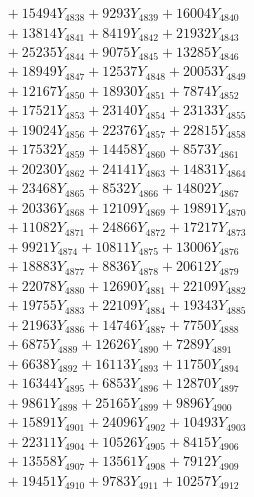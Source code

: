 \documentclass[a4paper,10pt]{article}
\begin{document}
{\begin{align}
&\;  + 15494 Y_{4838} + 9293 Y_{4839} + 16004 Y_{4840} \\[0.3ex]
&\;  + 13814 Y_{4841} + 8419 Y_{4842} + 21932 Y_{4843} \\[0.3ex]
&\;  + 25235 Y_{4844} + 9075 Y_{4845} + 13285 Y_{4846} \\[0.3ex]
&\;  + 18949 Y_{4847} + 12537 Y_{4848} + 20053 Y_{4849} \\[0.3ex]
&\;  + 12167 Y_{4850} + 18930 Y_{4851} + 7874 Y_{4852} \\[0.3ex]
&\;  + 17521 Y_{4853} + 23140 Y_{4854} + 23133 Y_{4855} \\[0.3ex]
&\;  + 19024 Y_{4856} + 22376 Y_{4857} + 22815 Y_{4858} \\[0.5ex]\allowbreak
&\;  + 17532 Y_{4859} + 14458 Y_{4860} + 8573 Y_{4861} \\[0.3ex]
&\;  + 20230 Y_{4862} + 24141 Y_{4863} + 14831 Y_{4864} \\[0.3ex]
&\;  + 23468 Y_{4865} + 8532 Y_{4866} + 14802 Y_{4867} \\[0.3ex]
&\;  + 20336 Y_{4868} + 12109 Y_{4869} + 19891 Y_{4870} \\[0.3ex]
&\;  + 11082 Y_{4871} + 24866 Y_{4872} + 17217 Y_{4873} \\[0.3ex]
&\;  + 9921 Y_{4874} + 10811 Y_{4875} + 13006 Y_{4876} \\[0.3ex]
&\;  + 18883 Y_{4877} + 8836 Y_{4878} + 20612 Y_{4879} \\[0.3ex]
&\;  + 22078 Y_{4880} + 12690 Y_{4881} + 22109 Y_{4882} \\[0.3ex]
&\;  + 19755 Y_{4883} + 22109 Y_{4884} + 19343 Y_{4885} \\[0.3ex]
&\;  + 21963 Y_{4886} + 14746 Y_{4887} + 7750 Y_{4888} \\[0.5ex]\allowbreak
&\;  + 6875 Y_{4889} + 12626 Y_{4890} + 7289 Y_{4891} \\[0.3ex]
&\;  + 6638 Y_{4892} + 16113 Y_{4893} + 11750 Y_{4894} \\[0.3ex]
&\;  + 16344 Y_{4895} + 6853 Y_{4896} + 12870 Y_{4897} \\[0.3ex]
&\;  + 9861 Y_{4898} + 25165 Y_{4899} + 9896 Y_{4900} \\[0.3ex]
&\;  + 15891 Y_{4901} + 24096 Y_{4902} + 10493 Y_{4903} \\[0.3ex]
&\;  + 22311 Y_{4904} + 10526 Y_{4905} + 8415 Y_{4906} \\[0.3ex]
&\;  + 13558 Y_{4907} + 13561 Y_{4908} + 7912 Y_{4909} \\[0.3ex]
&\;  + 19451 Y_{4910} + 9783 Y_{4911} + 10257 Y_{4912} \\[0.3ex]

\end{align}}
\end{document}
